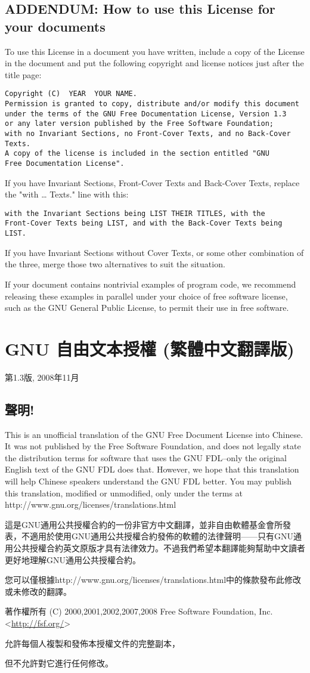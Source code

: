 \section{ADDENDUM: How to use this License for your documents}
To use this License in a document you have written, include a copy of the License in the document and put the following copyright and license notices just after the title page:\par
\begin{verbatim}
Copyright (C)  YEAR  YOUR NAME.
Permission is granted to copy, distribute and/or modify this document
under the terms of the GNU Free Documentation License, Version 1.3
or any later version published by the Free Software Foundation;
with no Invariant Sections, no Front-Cover Texts, and no Back-Cover Texts.
A copy of the license is included in the section entitled "GNU
Free Documentation License".
\end{verbatim}    
If you have Invariant Sections, Front-Cover Texts and Back-Cover Texts, replace the "with … Texts." line with this:
\begin{verbatim}
with the Invariant Sections being LIST THEIR TITLES, with the
Front-Cover Texts being LIST, and with the Back-Cover Texts being LIST.
\end{verbatim}  
If you have Invariant Sections without Cover Texts, or some other combination of the three, merge those two alternatives to suit the situation.\par
If your document contains nontrivial examples of program code, we recommend releasing these examples in parallel under your choice of free software license, such as the GNU General Public License, to permit their use in free software. 
\chapter{GNU 自由文本授權 (繁體中文翻譯版)}
\cite{fdlzht}
第1.3版, 2008年11月
\section{聲明!}
This is an unofficial translation of the GNU Free Document License into Chinese. It was not published by the Free Software Foundation, and does not legally state the distribution terms for software that uses the GNU FDL--only the original English text of the GNU FDL does that. However, we hope that this translation will help Chinese speakers understand the GNU FDL better. You may publish this translation, modified or unmodified, only under the terms at http://www.gnu.org/licenses/translations.html\par
這是GNU通用公共授權合約的一份非官方中文翻譯，並非自由軟體基金會所發表，不適用於使用GNU通用公共授權合約發佈的軟體的法律聲明——只有GNU通用公共授權合約英文原版才具有法律效力。不過我們希望本翻譯能夠幫助中文讀者更好地理解GNU通用公共授權合約。\par 您可以僅根據http://www.gnu.org/licenses/translations.html中的條款發布此修改或未修改的翻譯。\par
著作權所有 (C) 2000,2001,2002,2007,2008 Free Software Foundation, Inc.<\url{http://fsf.org/}>\par
允許每個人複製和發佈本授權文件的完整副本，\par
但不允許對它進行任何修改。
